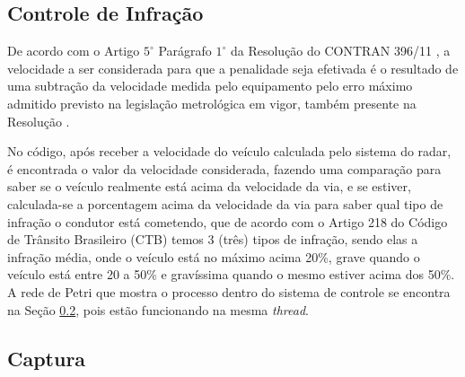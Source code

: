 \subsection{Controle de Infração}
  
De acordo com o Artigo $5^{\circ}$ Parágrafo $1^{\circ}$ da Resolução do CONTRAN 396/11 \cite{contranVI}, a velocidade a ser considerada para que a penalidade seja efetivada é o resultado de uma subtração da velocidade medida pelo equipamento pelo erro máximo admitido previsto na legislação metrológica em vigor, também presente na Resolução \cite{contranVI}.
   
 No código, após receber a velocidade do veículo calculada pelo sistema do radar, é encontrada o valor da velocidade considerada, fazendo uma comparação para saber se o veículo realmente está acima da velocidade da via, e se estiver, calculada-se a porcentagem acima da velocidade da via para saber qual tipo de infração o condutor está cometendo, que de acordo com o Artigo 218 do Código de Trânsito Brasileiro (CTB) \cite{ctb} temos 3 (três) tipos de infração, sendo elas a infração média, onde o veículo está no máximo acima 20\%, grave quando o veículo está entre 20 a 50\% e gravíssima quando o mesmo estiver acima dos 50\%.   
A rede de Petri que mostra o processo dentro do sistema de controle se encontra na Seção \ref{Captura}, pois estão funcionando na mesma \emph{thread}.
    

\subsection{Captura}\label{Captura}
    
